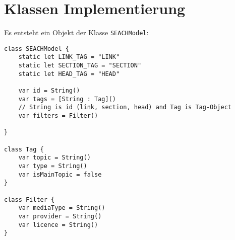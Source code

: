 \author{Gottfried von Recum}

\chapter{Klassen Implementierung}

Es entsteht ein Objekt der Klasse \Verb|SEACHModel|:

\begin{lstlisting}
class SEACHModel {
    static let LINK_TAG = "LINK"
    static let SECTION_TAG = "SECTION"
    static let HEAD_TAG = "HEAD"
    
    var id = String()
    var tags = [String : Tag]()
    // String is id (link, section, head) and Tag is Tag-Object
    var filters = Filter()

}

class Tag {
    var topic = String()
    var type = String()
    var isMainTopic = false
}

class Filter {
    var mediaType = String()
    var provider = String()
    var licence = String()
}\end{lstlisting}